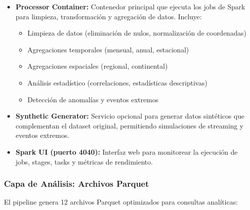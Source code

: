 \documentclass[12pt,a4paper]{scrartcl}
\begin{document}
\begin{itemize}
    \item \textbf{Processor Container:} Contenedor principal que ejecuta los jobs de Spark para limpieza, transformación y agregación de datos. Incluye:
    \begin{itemize}
        \item Limpieza de datos (eliminación de nulos, normalización de coordenadas)
        \item Agregaciones temporales (mensual, anual, estacional)
        \item Agregaciones espaciales (regional, continental)
        \item Análisis estadístico (correlaciones, estadísticas descriptivas)
        \item Detección de anomalías y eventos extremos
    \end{itemize}
    
    \item \textbf{Synthetic Generator:} Servicio opcional para generar datos sintéticos que complementan el dataset original, permitiendo simulaciones de streaming y eventos extremos.
    
    \item \textbf{Spark UI (puerto 4040):} Interfaz web para monitorear la ejecución de jobs, stages, tasks y métricas de rendimiento.
\end{itemize}

\subsubsection{Capa de Análisis: Archivos Parquet}

El pipeline genera 12 archivos Parquet optimizados para consultas analíticas:
\end{document}
